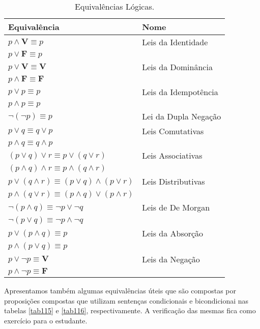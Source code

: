\begin{table}[H]
	\centering
	\begin{tabular}{|l|l|}%
	\toprule
	\textbf{Equivalência} & \textbf{Nome}\\
	\midrule
	$p \land \textbf{V} \equiv p$ &	Leis da Identidade\\
	$p \lor \textbf{F} \equiv p$ &	\\
	\midrule
	$p \lor \textbf{V} \equiv \textbf{V}$ &	Leis da Dominância\\
	$p \land \textbf{F} \equiv \textbf{F}$ &\\
	\midrule
	$p \lor p \equiv p$ &	Leis da Idempotência\\
	$p \land p \equiv p$ &	\\
	\midrule
	$\lnot (\lnot p) \equiv p$ & Lei da Dupla Negação\\
	\midrule
	$p \lor q \equiv q \lor p$ & Leis Comutativas\\
	$p \land q \equiv q \land p$ &\\
	\midrule
	$(p \lor q) \lor r \equiv p \lor (q \lor r)$ & Leis Associativas\\
	$(p \land q) \land r \equiv p \land (q \land r)$ &\\
	\midrule
	$p \lor (q \land r) \equiv (p \lor q) \land (p \lor r)$ & Leis Distributivas \\
	$p \land (q \lor r) \equiv (p \land q) \lor (p \land r)$ & \\
	\midrule
	$\lnot (p \land q) \equiv \lnot p \lor \lnot q$ & Leis de De Morgan\\
	$\lnot (p \lor q) \equiv \lnot p \land \lnot q$ &\\
	\midrule
	$p \lor (p \land q) \equiv p$ & Leis da Absorção\\
	$p \land (p \lor q) \equiv p$ &\\
	\midrule
	$p \lor \lnot p \equiv \textbf{V}$ & Leis da Negação\\
	$p \land \lnot p \equiv \textbf{F}$ &	\\
	\bottomrule%
	\end{tabular}%
	\caption{Equivalências Lógicas.}
	\label{tab114}
\end{table}

Apresentamos também algumas equivalências úteis que são compostas por
proposições compostas que utilizam sentenças condicionais e bicondicionai nas
tabelas \ref{tab115} e \ref{tab116}, respectivamente. A verificação das
mesmas fica como exercício para o estudante.

